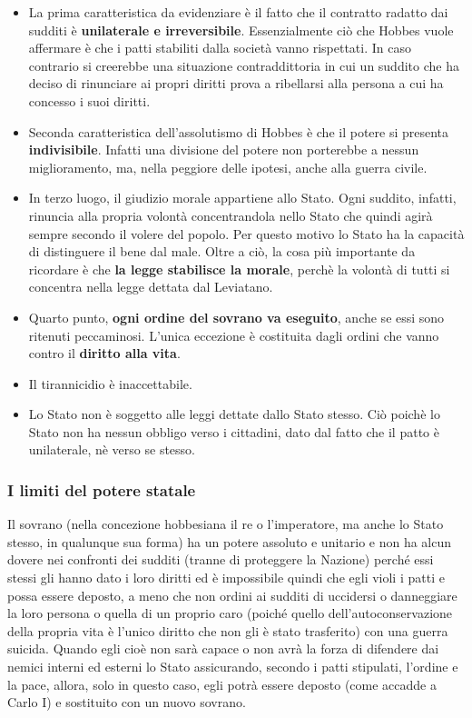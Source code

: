 \documentclass[10pt,a4paper]{article}
\begin{document}
	\begin{itemize}
		\item La prima caratteristica da evidenziare è il fatto che il contratto radatto dai sudditi è \textbf{unilaterale e irreversibile}. Essenzialmente ciò che Hobbes vuole affermare è che i patti stabiliti dalla società vanno rispettati. In caso contrario si creerebbe una situazione contraddittoria in cui un suddito che ha deciso di rinunciare ai propri diritti prova a ribellarsi alla persona a cui ha concesso i suoi diritti.
		\item Seconda caratteristica dell'assolutismo di Hobbes è che il potere si presenta \textbf{indivisibile}. Infatti una divisione del potere non porterebbe a nessun miglioramento, ma, nella peggiore delle ipotesi, anche alla guerra civile.
		\item In terzo luogo, il giudizio morale appartiene allo Stato. Ogni suddito, infatti, rinuncia alla propria volontà concentrandola nello Stato che quindi agirà sempre secondo il volere del popolo. Per questo motivo lo Stato ha la capacità di distinguere il bene dal male. Oltre a ciò, la cosa più importante da ricordare è che \textbf{la legge stabilisce la morale}, perchè la volontà di tutti si concentra nella legge dettata dal Leviatano.
		\item Quarto punto, \textbf{ogni ordine del sovrano va eseguito}, anche se essi sono ritenuti peccaminosi. L'unica eccezione è costituita dagli ordini che vanno contro il \textbf{diritto alla vita}.
		\item Il tirannicidio è inaccettabile.
		\item Lo Stato non è soggetto alle leggi dettate dallo Stato stesso. Ciò poichè lo Stato non ha nessun obbligo verso i cittadini, dato dal fatto che il patto è unilaterale, nè verso se stesso. 
	\end{itemize}

	\subsubsection*{I limiti del potere statale}
	
	Il sovrano (nella concezione hobbesiana il re o l'imperatore, ma anche lo Stato stesso, in qualunque sua forma) ha un potere assoluto e unitario e non ha alcun dovere nei confronti dei sudditi (tranne di proteggere la Nazione) perché essi stessi gli hanno dato i loro diritti ed è impossibile quindi che egli violi i patti e possa essere deposto, a meno che non ordini ai sudditi di uccidersi o danneggiare la loro persona o quella di un proprio caro (poiché quello dell'autoconservazione della propria vita è l'unico diritto che non gli è stato trasferito) con una guerra suicida. Quando egli cioè non sarà capace o non avrà la forza di difendere dai nemici interni ed esterni lo Stato assicurando, secondo i patti stipulati, l'ordine e la pace, allora, solo in questo caso, egli potrà essere deposto (come accadde a Carlo I) e sostituito con un nuovo sovrano.
	
\end{document}
